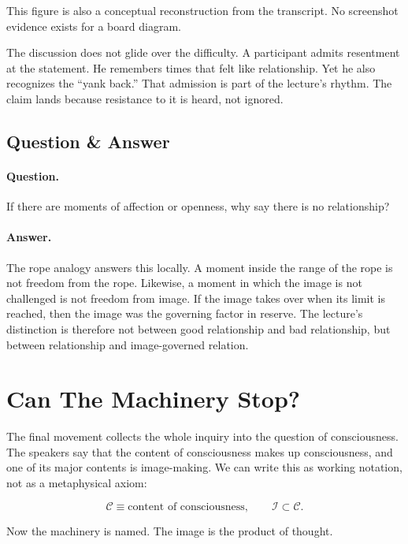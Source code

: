 This figure is also a conceptual reconstruction from the transcript. No screenshot evidence exists for a board diagram.

The discussion does not glide over the difficulty. A participant admits resentment at the statement. He remembers times that felt like relationship. Yet he also recognizes the ``yank back.'' That admission is part of the lecture's rhythm. The claim lands because resistance to it is heard, not ignored.

\subsection{Question \& Answer}

\paragraph{Question.}
If there are moments of affection or openness, why say there is no relationship?

\paragraph{Answer.}
The rope analogy answers this locally. A moment inside the range of the rope is not freedom from the rope. Likewise, a moment in which the image is not challenged is not freedom from image. If the image takes over when its limit is reached, then the image was the governing factor in reserve. The lecture's distinction is therefore not between good relationship and bad relationship, but between relationship and image-governed relation.

\section{Can The Machinery Stop?}

The final movement collects the whole inquiry into the question of consciousness. The speakers say that the content of consciousness makes up consciousness, and one of its major contents is image-making. We can write this as working notation, not as a metaphysical axiom:

\begin{equation}
\mathcal{C} \equiv \text{content of consciousness},
\qquad
\mathcal{I} \subset \mathcal{C}.
\end{equation}

Now the machinery is named. The image is the product of thought.

